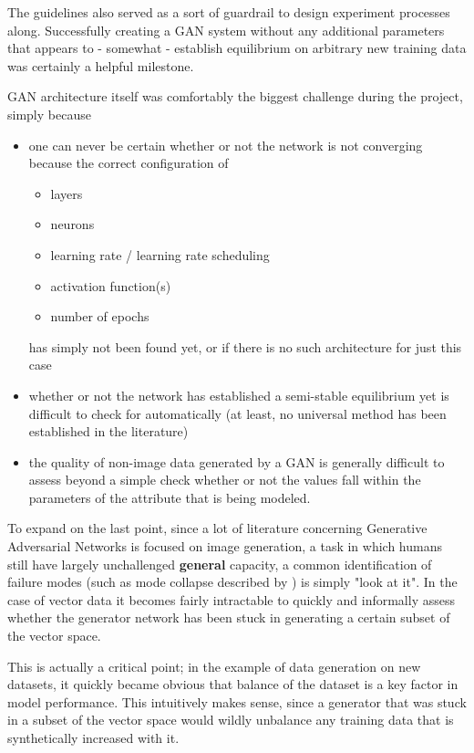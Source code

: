 The guidelines also served as a sort of guardrail to design experiment processes along. 
Successfully creating a \ac{GAN} system without any additional parameters that appears to - somewhat - establish equilibrium on arbitrary new training data was certainly a helpful milestone.

\ac{GAN} architecture itself was comfortably the biggest challenge during the project, simply because 
\begin{itemize}
	\item one can never be certain whether or not the network is not converging because the correct configuration of 
	\begin{itemize}
		\item layers
		\item neurons
		\item learning rate / learning rate scheduling
		\item activation function(s)
		\item number of epochs
	\end{itemize} has simply not been found yet, or if there is no such architecture for just this case
	\item whether or not the network has established a semi-stable equilibrium yet is difficult to check for automatically (at least, no universal method has been established in the literature)
	\item the quality of non-image data generated by a \ac{GAN} is generally difficult to assess beyond a simple check whether or not the values fall within the parameters of the attribute that is being modeled.
\end{itemize}

To expand on the last point, since a lot of literature concerning Generative Adversarial Networks is focused on image generation, a task in which humans still have largely unchallenged \textbf{general} capacity, a common identification of failure modes (such as mode collapse described by \cite{mode_collapse}) is simply "look at it". In the case of vector data it becomes fairly intractable to quickly and informally assess whether the generator network has been stuck in generating a certain subset of the vector space.

This is actually a critical point; in the example of data generation on new datasets, it quickly became obvious that balance of the dataset is a key factor in model performance. This intuitively makes sense, since a generator that was stuck in a subset of the vector space would wildly unbalance any training data that is synthetically increased with it.

